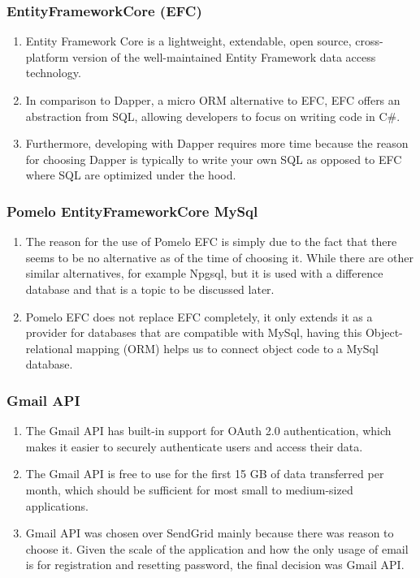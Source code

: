 \documentclass[singlespacing,12pt,parskip,headsepline,consistentlayout]{article}
\begin{document}
\subsubsection{EntityFrameworkCore (EFC)}
\begin{enumerate}
    \item Entity Framework Core is a lightweight, extendable, open source, cross-platform version of the well-maintained Entity Framework data access technology. \cite{efcoreDocs}
    \item In comparison to Dapper, a micro ORM alternative to EFC, EFC offers an abstraction from SQL, allowing developers to focus on writing code in C\#.
    \item Furthermore, developing with Dapper requires more time because the reason for choosing Dapper is typically to write your own SQL as opposed to EFC where SQL are optimized under the hood.
\end{enumerate}
\subsubsection{Pomelo EntityFrameworkCore MySql}
\begin{enumerate}
    \item The reason for the use of Pomelo EFC is simply due to the fact that there seems to be no alternative as of the time of choosing it. While there are other similar alternatives, for example Npgsql, but it is used with a difference database and that is a topic to be discussed later.
    \item Pomelo EFC does not replace EFC completely, it only extends it as a provider for databases that are compatible with MySql, having this Object-relational mapping (ORM) helps us to connect object code to a MySql database.
\end{enumerate}

\subsubsection{Gmail API}
\begin{enumerate}
    \item The Gmail API has built-in support for OAuth 2.0 authentication, which makes it easier to securely authenticate users and access their data. \cite{gmailapiDocs}
    \item The Gmail API is free to use for the first 15 GB of data transferred per month, which should be sufficient for most small to medium-sized applications.
    \item Gmail API was chosen over SendGrid mainly because there was reason to choose it. Given the scale of the application and how the only usage of email is for registration and resetting password, the final decision was Gmail API.
\end{enumerate}
\end{document}
